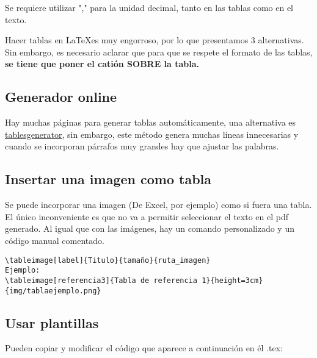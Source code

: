 Se requiere utilizar "," para la unidad decimal, tanto en las tablas como en el texto.

Hacer tablas en \LaTeX es muy engorroso, por lo que presentamos 3 alternativas. Sin embargo, es necesario aclarar que para que se respete el formato de las tablas, \textbf{se tiene que poner el catión SOBRE la tabla.}

\subsection{Generador online}
Hay muchas páginas para generar tablas automáticamente, una alternativa es \href{https://www.tablesgenerator.com}{tablesgenerator}, sin embargo, este método genera muchas líneas innecesarias y cuando se incorporan párrafos muy grandes hay que ajustar las palabras.

\subsection{Insertar una imagen como tabla}
Se puede incorporar una imagen (De Excel, por ejemplo) como si fuera una tabla. El único inconveniente es que no va a permitir seleccionar el texto en el pdf generado. Al igual que con las imágenes, hay un comando personalizado y un código manual comentado.
\begin{verbatim}
\tableimage[label]{Titulo}{tamaño}{ruta_imagen}
Ejemplo:
\tableimage[referencia3]{Tabla de referencia 1}{height=3cm}{img/tablaejemplo.png}
\end{verbatim}





\newpage
\subsection{Usar plantillas}
Pueden copiar y modificar el código que aparece a continuación en él .tex:


